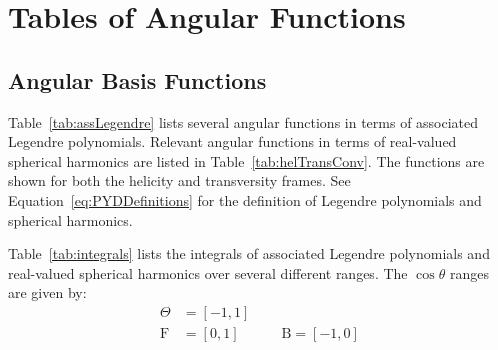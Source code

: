 \section{Tables of Angular Functions} \label{sec:angFuncTables}

\subsection{Angular Basis Functions} \label{sec:angBasisFuncTables}
Table~\ref{tab:assLegendre} lists several angular functions in terms of associated Legendre
polynomials. Relevant angular functions in terms of real-valued spherical harmonics are listed in
Table~\ref{tab:helTransConv}. The functions are shown for both the helicity and transversity
frames. See Equation~\ref{eq:PYDDefinitions} for the definition of Legendre polynomials and
spherical harmonics.

Table~\ref{tab:integrals} lists the integrals of associated Legendre polynomials and
real-valued spherical harmonics over several different ranges. The $\cos\theta$ ranges are given
by:
\begin{equation}
  \begin{split}
    \Theta   &= [-1,1] \\
    \text{F} &= [0,1] \qquad\quad \text{B} = [-1,0]
  \end{split}
  \label{eq:thetaRanges}
\end{equation}
\begin{center}
  \resizebox{0.25\textwidth}{!}{}
\end{center}

